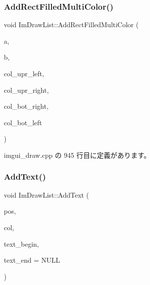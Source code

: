 \subsubsection{\texorpdfstring{Add\+Rect\+Filled\+Multi\+Color()}{AddRectFilledMultiColor()}}
{\footnotesize\ttfamily void Im\+Draw\+List\+::\+Add\+Rect\+Filled\+Multi\+Color (\begin{DoxyParamCaption}\item[{const \mbox{\hyperlink{struct_im_vec2}{Im\+Vec2}} \&}]{a,  }\item[{const \mbox{\hyperlink{struct_im_vec2}{Im\+Vec2}} \&}]{b,  }\item[{\mbox{\hyperlink{imgui_8h_a118cff4eeb8d00e7d07ce3d6460eed36}{Im\+U32}}}]{col\+\_\+upr\+\_\+left,  }\item[{\mbox{\hyperlink{imgui_8h_a118cff4eeb8d00e7d07ce3d6460eed36}{Im\+U32}}}]{col\+\_\+upr\+\_\+right,  }\item[{\mbox{\hyperlink{imgui_8h_a118cff4eeb8d00e7d07ce3d6460eed36}{Im\+U32}}}]{col\+\_\+bot\+\_\+right,  }\item[{\mbox{\hyperlink{imgui_8h_a118cff4eeb8d00e7d07ce3d6460eed36}{Im\+U32}}}]{col\+\_\+bot\+\_\+left }\end{DoxyParamCaption})}



 imgui\+\_\+draw.\+cpp の 945 行目に定義があります。

\mbox{\label{struct_im_draw_list_ac5221bd86b3429f6d5b6e6ffe454942d}} 
\subsubsection{\texorpdfstring{Add\+Text()}{AddText()}\hspace{0.1cm}{\footnotesize\ttfamily [1/2]}}
{\footnotesize\ttfamily void Im\+Draw\+List\+::\+Add\+Text (\begin{DoxyParamCaption}\item[{const \mbox{\hyperlink{struct_im_vec2}{Im\+Vec2}} \&}]{pos,  }\item[{\mbox{\hyperlink{imgui_8h_a118cff4eeb8d00e7d07ce3d6460eed36}{Im\+U32}}}]{col,  }\item[{const char $\ast$}]{text\+\_\+begin,  }\item[{const char $\ast$}]{text\+\_\+end = {\ttfamily NULL} }\end{DoxyParamCaption})}



